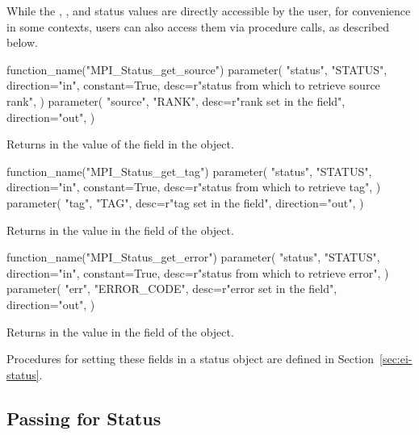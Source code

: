 While the , , and 
status values are directly accessible by the user,
for convenience in some contexts, users can also access
them via procedure calls, as described below.

%
\begin{mpi-binding}
    function_name("MPI_Status_get_source")
    parameter(
        "status",
        "STATUS",
        direction="in", constant=True,
        desc=r"status from which to retrieve source rank",
    )
    parameter(
        "source",
        "RANK",
        desc=r"rank set in the  field",
        direction="out",
    )
\end{mpi-binding}

Returns in  the value of the  field in the  object.

%
\begin{mpi-binding}
    function_name("MPI_Status_get_tag")
    parameter(
        "status",
        "STATUS",
        direction="in", constant=True,
        desc=r"status from which to retrieve tag",
    )
    parameter(
        "tag",
        "TAG",
        desc=r"tag set in the  field",
        direction="out",
    )
\end{mpi-binding}

Returns in  the value in the  field of the  object.


%
\begin{mpi-binding}
    function_name("MPI_Status_get_error")
    parameter(
        "status",
        "STATUS",
        direction="in", constant=True,
        desc=r"status from which to retrieve error",
    )
    parameter(
        "err",
        "ERROR_CODE",
        desc=r"error set in the  field",
        direction="out",
    )
\end{mpi-binding}

Returns in  the value in the  field of the  object.

Procedures for setting these fields in a status object are defined in Section~\ref{sec:ei-status}.

\subsection{Passing \texorpdfstring{}{MPI\_STATUS\_IGNORE} for Status}
\label{sec:pt2pt-status-ignore}

